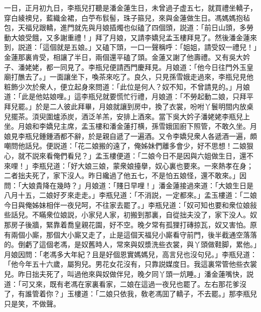 一日，正月初九日，李瓶兒打聽是潘金蓮生日，未曾過子虚五七，就買禮坐轎子，穿白綾襖兒，藍織金裙，白苧布䯼髻，珠子箍兒，來與金蓮做生日。馮媽媽抱毡包，天福兒跟轎，進門就先與月娘插燭也似磕了四個頭，説道：「前日山頭，多勞動大娘受餓，又多謝重禮！」拜了月娘，又請李嬌兒孟玉樓拜見了。然後潘金蓮來到，説道：「這個就是五娘。」又磕下頭，一口一聲稱呼：「姐姐，請受奴一禮兒！」金蓮那裏肯受，相讓了半日，兩個還平磕了頭。金蓮又謝了他壽禮。又有吳大妗子、潘姥姥，都一同見了。李瓶兒便請西門慶拜見。月娘道：「他今日往門外玉皇廟打醮去了。」一面讓坐下，喚茶來吃了。良久，只見孫雪娥走過來，李瓶兒見他粧飾少次於衆人，便立起身來問道：「此位是何人？奴不知，不曾請見的。」月娘道：「此是他姑娘哩。」這李瓶兒就要慌忙行禮，月娘道：「不勞起動二娘，只拜平拜兒罷。」於是二人彼此拜畢，月娘就讓到房中，換了衣裳，吩咐丫鬟明間内放桌兒擺茶。湏臾圍爐添炭，酒泛羊羔，安排上酒來。當下吳大妗子潘姥姥李瓶兒上坐。月娘和李嬌兒主席，孟玉樓和潘金蓮打横，孫雪娥囬廚下照管，不敢久坐。月娘見李瓶兒鍾鍾酒都不辭，於是親自遞了一遍酒。又令李嬌兒衆人各遞酒一遍，頗嘲問他話兒。便説道：「花二娘搬的遠了，俺姊妹們離多會少，好不思想！二娘狠心，就不説來看俺們看兒？」孟玉樓便道：「二娘今日不是因與六姐做生日，還不來哩！」李瓶兒道：「好大娘三娘，蒙衆娘擡擧，奴心裏也要來。一來熱孝在身；二者拙夫死了，家下沒人。昨日纔過了他五七，不是怕五娘怪，還不敢來。」因問：「大娘貴降在幾時？」月娘道：「賤日早哩！」潘金蓮接過來道：「大娘生日是八月十五，二娘好歹來走走。」李瓶兒道：「不消説，一定都來。」孟玉樓道：「二娘今日與俺姊妹相伴一夜兒呵，不往家去罷了。」李瓶兒道：「奴可知也要和衆位娘敍些話兒。不瞞衆位娘説，小家兒人家，初搬到那裏，自從拙夫没了，家下没人。奴那房子後牆，緊靠着喬皇親花園，好不空。晚夕常有孤狸打磚掠瓦，奴又害怕。原有兩個小廝，那個大小廝又走了，止是這個天福兒小廝看守前門，後半截通空落落的。倒虧了這個老馮，是奴舊時人，常來與奴漿洗些衣裳，與丫頭做鞋脚，累他。」月娘因問：「老馮多大年紀？且是好個恩實媽媽兒，高言兒也沒句兒。」李瓶兒道：「他今年五十六歲，屬狗兒。男花女花沒有，只靠説媒度日。我這裏常管他些衣裳兒。昨日拙夫死了，叫過他來與奴做伴兒，晚夕同丫頭一炕睡。」潘金蓮嘴快，説道：「可又來，既有老馮在家裏看家，二娘在這過一夜兒也罷了。左右那花爹沒了，有誰管着你？」玉樓道：「二娘只依我，敎老馮囬了轎子，不去罷。」那李瓶兒只是笑，不做聲。

